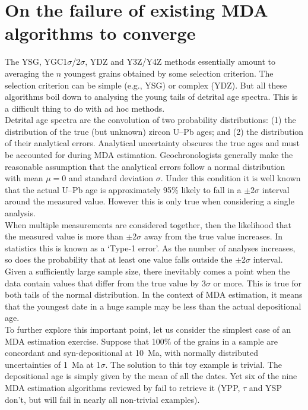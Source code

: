 \documentclass{article}
\begin{document}
\section{On the failure of existing MDA algorithms to converge}
\label{sec:convergence}

The YSG, YGC1$\sigma$/2$\sigma$, YDZ and Y3Z/Y4Z methods essentially
amount to averaging the $n$ youngest grains obtained by some selection
criterion. The selection criterion can be simple (e.g., YSG) or
complex (YDZ).  But all these algorithms boil down to analysing the
young tails of detrital age spectra. This is a difficult thing to do
with ad hoc methods.\\

Detrital age spectra are the convolution of two probability
distributions: (1) the distribution of the true (but unknown) zircon
U--Pb ages; and (2) the distribution of their analytical
errors. Analytical uncertainty obscures the true ages and must be
accounted for during MDA estimation.  Geochronologists generally make
the reasonable assumption that the analytical errors follow a normal
distribution with mean $\mu = 0$ and standard deviation
$\sigma$. Under this condition it is well known that the actual U--Pb
age is approximately 95\% likely to fall in a $\pm$2$\sigma$ interval
around the measured value. However this is only true when considering
a single analysis.\\

When multiple measurements are considered together, then the
likelihood that the measured value is more than $\pm$2$\sigma$ away
from the true value increases. In statistics this is known as a
`Type-1 error'. As the number of analyses increases, so does the
probability that at least one value falls outside the $\pm$2$\sigma$
interval. Given a sufficiently large sample size, there inevitably
comes a point when the data contain values that differ from the true
value by 3$\sigma$ or more. This is true for both tails of the normal
distribution. In the context of MDA estimation, it means that the
youngest date in a huge sample may be less than the actual
depositional age.\\

To further explore this important point, let us consider the simplest
case of an MDA estimation exercise. Suppose that 100\% of the grains
in a sample are concordant and syn-depositional at 10~Ma, with
normally distributed uncertainties of 1~Ma at 1$\sigma$. The solution
to this toy example is trivial. The depositional age is simply given
by the mean of all the dates. Yet six of the nine MDA estimation
algorithms reviewed by \citet{coutts2019} fail to retrieve it (YPP,
$\tau$ and YSP don't, but will fail in nearly all non-trivial
examples).\\
\end{document}
